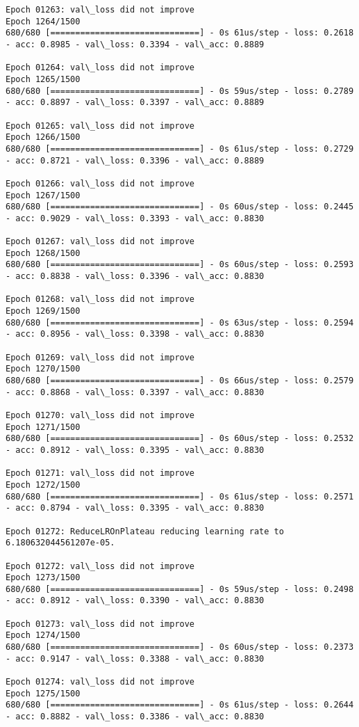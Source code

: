 \documentclass[11pt]{article}
\begin{document}
\begin{Verbatim}[commandchars=\\\{\}]
Epoch 01263: val\_loss did not improve
Epoch 1264/1500
680/680 [==============================] - 0s 61us/step - loss: 0.2618 - acc: 0.8985 - val\_loss: 0.3394 - val\_acc: 0.8889

Epoch 01264: val\_loss did not improve
Epoch 1265/1500
680/680 [==============================] - 0s 59us/step - loss: 0.2789 - acc: 0.8897 - val\_loss: 0.3397 - val\_acc: 0.8889

Epoch 01265: val\_loss did not improve
Epoch 1266/1500
680/680 [==============================] - 0s 61us/step - loss: 0.2729 - acc: 0.8721 - val\_loss: 0.3396 - val\_acc: 0.8889

Epoch 01266: val\_loss did not improve
Epoch 1267/1500
680/680 [==============================] - 0s 60us/step - loss: 0.2445 - acc: 0.9029 - val\_loss: 0.3393 - val\_acc: 0.8830

Epoch 01267: val\_loss did not improve
Epoch 1268/1500
680/680 [==============================] - 0s 60us/step - loss: 0.2593 - acc: 0.8838 - val\_loss: 0.3396 - val\_acc: 0.8830

Epoch 01268: val\_loss did not improve
Epoch 1269/1500
680/680 [==============================] - 0s 63us/step - loss: 0.2594 - acc: 0.8956 - val\_loss: 0.3398 - val\_acc: 0.8830

Epoch 01269: val\_loss did not improve
Epoch 1270/1500
680/680 [==============================] - 0s 66us/step - loss: 0.2579 - acc: 0.8868 - val\_loss: 0.3397 - val\_acc: 0.8830

Epoch 01270: val\_loss did not improve
Epoch 1271/1500
680/680 [==============================] - 0s 60us/step - loss: 0.2532 - acc: 0.8912 - val\_loss: 0.3395 - val\_acc: 0.8830

Epoch 01271: val\_loss did not improve
Epoch 1272/1500
680/680 [==============================] - 0s 61us/step - loss: 0.2571 - acc: 0.8794 - val\_loss: 0.3395 - val\_acc: 0.8830

Epoch 01272: ReduceLROnPlateau reducing learning rate to 6.180632044561207e-05.

Epoch 01272: val\_loss did not improve
Epoch 1273/1500
680/680 [==============================] - 0s 59us/step - loss: 0.2498 - acc: 0.8912 - val\_loss: 0.3390 - val\_acc: 0.8830

Epoch 01273: val\_loss did not improve
Epoch 1274/1500
680/680 [==============================] - 0s 60us/step - loss: 0.2373 - acc: 0.9147 - val\_loss: 0.3388 - val\_acc: 0.8830

Epoch 01274: val\_loss did not improve
Epoch 1275/1500
680/680 [==============================] - 0s 61us/step - loss: 0.2644 - acc: 0.8882 - val\_loss: 0.3386 - val\_acc: 0.8830


\end{Verbatim}
\end{document}

